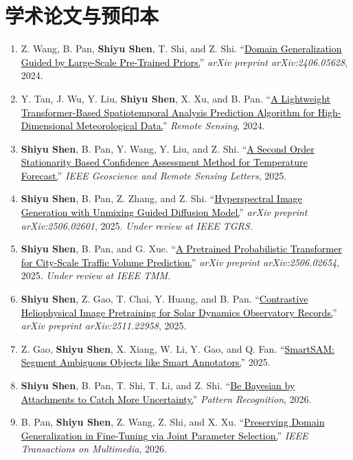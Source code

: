 \documentclass[10pt,a4paper]{article}
\newcommand{\me}{\textbf{Shiyu Shen}}
\newcommand{\status}[1]{\textcolor{slate}{\textit{#1}}}
\newcommand{\papertitle}[2]{\href{#1}{\textcolor{black}{#2}}}
\begin{document}
\section{学术论文与预印本}
\begin{enumerate}
  \item Z. Wang, B. Pan, \me, T. Shi, and Z. Shi. ``\papertitle{https://arxiv.org/abs/2406.05628}{Domain Generalization Guided by Large-Scale Pre-Trained Priors.}'' \textit{arXiv preprint arXiv:2406.05628}, 2024.
  \item Y. Tan, J. Wu, Y. Liu, \me, X. Xu, and B. Pan. ``\papertitle{https://doi.org/10.3390/rs16234545}{A Lightweight Transformer-Based Spatiotemporal Analysis Prediction Algorithm for High-Dimensional Meteorological Data.}'' \textit{Remote Sensing}, 2024.
  \item \me, B. Pan, Y. Wang, Y. Liu, and Z. Shi. ``\papertitle{https://ieeexplore.ieee.org/document/10852282}{A Second Order Stationarity Based Confidence Assessment Method for Temperature Forecast.}'' \textit{IEEE Geoscience and Remote Sensing Letters}, 2025.
  \item \me, B. Pan, Z. Zhang, and Z. Shi. ``\papertitle{https://arxiv.org/abs/2506.02601}{Hyperspectral Image Generation with Unmixing Guided Diffusion Model.}'' \textit{arXiv preprint arXiv:2506.02601}, 2025. \status{Under review at IEEE TGRS.}
  \item \me, B. Pan, and G. Xue. ``\papertitle{https://arxiv.org/abs/2506.02654}{A Pretrained Probabilistic Transformer for City-Scale Traffic Volume Prediction.}'' \textit{arXiv preprint arXiv:2506.02654}, 2025. \status{Under review at IEEE TMM.}
  \item \me, Z. Gao, T. Chai, Y. Huang, and B. Pan. ``\papertitle{https://arxiv.org/abs/2511.22958}{Contrastive Heliophysical Image Pretraining for Solar Dynamics Observatory Records.}'' \textit{arXiv preprint arXiv:2511.22958}, 2025.
  \item Z. Gao, \me, X. Xiang, W. Li, Y. Gao, and Q. Fan. ``\papertitle{https://openreview.net/forum?id=08pxmTLKTT}{SmartSAM: Segment Ambiguous Objects like Smart Annotators.}'' 2025.
  \item \me, B. Pan, T. Shi, T. Li, and Z. Shi. ``\papertitle{https://doi.org/10.1016/j.patcog.2026.113084}{Be Bayesian by Attachments to Catch More Uncertainty.}'' \textit{Pattern Recognition}, 2026.
  \item B. Pan, \me, Z. Wang, Z. Shi, and X. Xu. ``\papertitle{https://arxiv.org/abs/2508.16976}{Preserving Domain Generalization in Fine-Tuning via Joint Parameter Selection.}'' \textit{IEEE Transactions on Multimedia}, 2026.

\end{enumerate}
\end{document}
